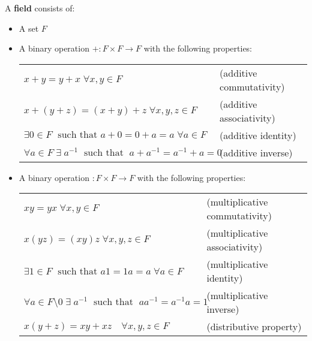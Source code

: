 \begin{definition*}[field] A \textbf{field} consists of:
\begin{itemize} 
\item A set $F$
\item A binary operation $+ : F\times F\rightarrow F$ with the following properties:
\par
\begin{tabular}{ll}
$x+y=y+x\;\forall x,y\in F$ & (additive commutativity)\\
$x+(y+z)=(x+y)+z\;\forall x,y,z\in F$ & (additive associativity)\\
$\exists 0\in F\;\mbox{ such that } a+0=0+a=a\;\forall a\in F$ & (additive identity)\\
$\forall a\in F\;\exists\;a^{-1}\;\mbox{ such that }\; a+a^{-1}=a^{-1}+a=0$ & (additive inverse)\\ 
\end{tabular}
\item A binary operation $: F\times F\rightarrow F$ with the following properties:
\par
\begin{tabular}{ll}
$xy=yx\;\forall x,y\in F$ & (multiplicative commutativity)\\
$x(yz)=(xy)z\;\forall x,y,z\in F$ & (multiplicative associativity)\\
$\exists 1\in F\;\mbox{ such that } a1=1a=a\;\forall a\in F$ & (multiplicative identity)\\
$\forall a\in F\setminus 0\;\exists\;a^{-1}\;\mbox{ such that }\; aa^{-1}=a^{-1}a=1$ & (multiplicative inverse)\\ 
$x(y+z)=xy+xz\quad\forall x,y,z\in F$ & (distributive property)\\
\end{tabular}
\end{itemize}
\end{definition*}
\par\vspace{1 cm}
